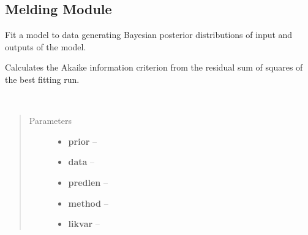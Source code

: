 \documentclass[a4paper,10pt,english]{sphinxmanual}
\begin{document}
\subsection{Melding Module}
\label{BIP.Bayes:module-BIP.Bayes.Melding}\label{BIP.Bayes:melding-module}

\begin{fulllineitems}
\label{BIP.Bayes:BIP.Bayes.Melding.FitModel}
Fit a model to data generating
Bayesian posterior distributions of input and
outputs of the model.

\begin{fulllineitems}
\label{BIP.Bayes:BIP.Bayes.Melding.FitModel.AIC_from_RSS}
Calculates the Akaike information criterion from the residual sum of squares 
of the best fitting run.

\end{fulllineitems}


\begin{fulllineitems}
\label{BIP.Bayes:BIP.Bayes.Melding.FitModel.do_inference}~\begin{quote}\begin{description}
\item[{Parameters}] \leavevmode\begin{itemize}
\item {} 
\textbf{prior} -- 

\item {} 
\textbf{data} -- 

\item {} 
\textbf{predlen} -- 

\item {} 
\textbf{method} -- 

\item {} 
\textbf{likvar} -- 

\end{itemize}


\end{description}
\end{quote}
\end{fulllineitems}
\end{fulllineitems}
\end{document}
